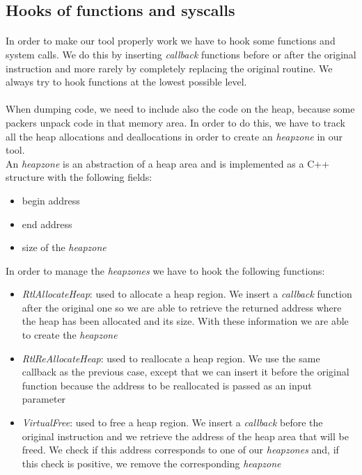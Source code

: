 \subsection{Hooks of functions and syscalls}
\label{Hooks of functions and syscalls}
\paragraph{}
In order to make our tool properly work we have to hook some functions and system calls. We do this by inserting \textit{callback} functions before or after the original instruction and more rarely by completely replacing the original routine. We always try to hook functions at the lowest possible level.
\paragraph{}
When dumping code, we need to include also the code on the heap, because some packers unpack code in that memory area. In order to do this, we have to track all the heap allocations and deallocations in order to create an \textit{heapzone} in our tool.\\
An \textit{heapzone} is an abstraction of a heap area and is implemented as a C++ structure with the following fields:
\begin{itemize}
\item begin address
\item end address
\item size of the \textit{heapzone}
\end{itemize}
In order to manage the \textit{heapzones} we have to hook the following functions:
\begin{itemize}
\item \textit{RtlAllocateHeap}: used to allocate a heap region. We insert a \textit{callback} function after the original one so we are able to retrieve the returned address where the heap has been allocated and its size. With these information we are able to create the \textit{heapzone}
\item \textit{RtlReAllocateHeap}: used to reallocate a heap region. We use the same callback as the previous case, except that we can insert it before the original function because the address to be reallocated is passed as an input parameter
\item \textit{VirtualFree}: used to free a heap region. We insert a \textit{callback} before the original instruction and we retrieve the address of the heap area that will be freed. We check if this address corresponds to one of our \textit{heapzones} and, if this check is positive, we remove the corresponding \textit{heapzone}
\end{itemize}

